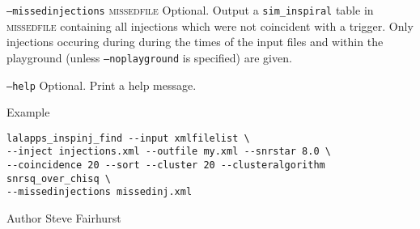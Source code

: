 \begin{entry}
\begin{entry}
\item[\texttt{--missedinjections} \textsc{missedfile}]  Optional.
Output a \texttt{sim\_inspiral} table in \textsc{missedfile} containing
all injections which were not coincident with a trigger.  Only
injections occuring during during the times of the input files and
within the playground (unless \texttt{--noplayground} is specified)
are given.
 
\item[\texttt{--help}] Optional.  Print a help message.
\end{entry}

\item[Example]
\begin{verbatim}
lalapps_inspinj_find --input xmlfilelist \
--inject injections.xml --outfile my.xml --snrstar 8.0 \
--coincidence 20 --sort --cluster 20 --clusteralgorithm snrsq_over_chisq \
--missedinjections missedinj.xml
\end{verbatim}

\item[Author] 
Steve Fairhurst
\end{entry}
\clearpage


